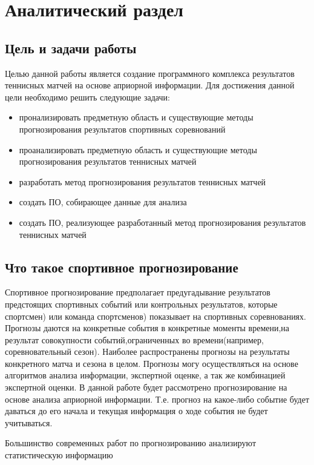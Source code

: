 \chapter{Аналитический раздел}
\label{cha:analysis}
\section{Цель и задачи работы}
Целью данной работы является создание программного комплекса результатов теннисных матчей на основе априорной информации.
Для достижения данной цели необходимо решить следующие задачи:
\begin{itemize}
	\item пронализировать предметную область и существующие методы прогнозирования результатов  спортивных соревнований
	\item проанализировать предметную область и существующие методы прогнозирования результатов теннисных матчей
	\item разработать метод прогнозирования результатов теннисных матчей
	\item создать ПО, собирающее данные для анализа
	\item создать ПО, реализующее  разработанный метод прогнозирования результатов теннисных матчей
\end{itemize}
\section{Что такое спортивное прогнозирование}
Спортивное прогнозирование предполагает предугадывание результатов предстоящих спортивных событий или контрольных результатов, которые спортсмен) или команда спортсменов) показывает на спортивных соревнованиях\cite{Book01}. Прогнозы даются на конкретные события в конкретные моменты времени,на результат совокупности событий,ограниченных во времени(например, соревновательный сезон). Наиболее распространены прогнозы на результаты конкретного матча и сезона в целом. Прогнозы могу осуществляться на основе алгоритмов анализа информации, экспертной оценке, а так же комбинацией экспертной оценки. В данной работе будет рассмотрено прогнозирование на основе анализа априорной информации. Т.е. прогноз на какое-либо событие будет даваться до его начала и текущая информация о ходе события не будет учитываться.

Большинство современных работ по прогнозированию анализируют статистическую информацию





